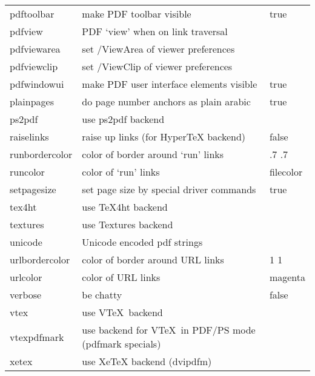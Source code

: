 \documentclass[a4paper,11pt]{article}
\newcommand{\optempty}{{\rmfamily\textit{empty}}}
\begin{document}
\begin{longtable}{@{}>{\ttfamily}lp{70mm}>{\ttfamily}l@{}}
pdftoolbar &make PDF toolbar visible&true\\
pdfview &PDF `view' when on link traversal&\optempty\\
pdfviewarea &set /ViewArea of viewer preferences&\optempty\\
pdfviewclip &set /ViewClip of viewer preferences&\optempty\\
pdfwindowui &make PDF user interface  elements visible&true\\
plainpages &do page number anchors as plain arabic&true\\
ps2pdf &use ps2pdf backend\\
raiselinks &raise up links (for HyperTeX backend)&false\\
runbordercolor &color of border around `run' links& 0 .7 .7\\
runcolor & color of `run' links& filecolor\\
setpagesize &set page size by special driver commands&true\\
tex4ht &use \TeX4ht backend\\
textures &use Textures backend\\
unicode &Unicode encoded pdf strings\\
urlbordercolor &color of border around URL links& 0 1 1\\
urlcolor &color of URL links&magenta\\
verbose &be chatty&false\\
vtex &use V\TeX\ backend\\
vtexpdfmark &use backend for V\TeX\ in PDF/PS mode (pdfmark specials)\\
xetex &use XeTeX backend (dvipdfm)\\
\hline
\end{longtable}
\end{document}
